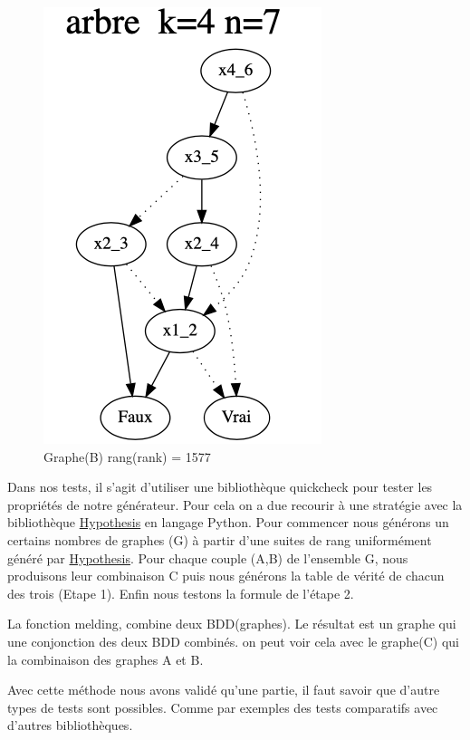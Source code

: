 \documentclass[french]{article}
\begin{document}
\begin{figure}[h!]
    \centering
    \includegraphics[scale=0.4]{arb_1577.png}
    \caption{Graphe(B) rang(rank) = 1577}
    \label{fig:graphe_B}
\end{figure}

Dans nos tests, il s'agit d'utiliser une bibliothèque quickcheck pour tester les propriétés de notre générateur.
Pour cela on a due recourir à une stratégie avec la bibliothèque \href{https://hypothesis.works}{Hypothesis} en langage Python.  Pour commencer nous générons un certains nombres de graphes (G) à partir d'une suites de rang uniformément généré par \href{https://hypothesis.works}{Hypothesis}. Pour chaque couple (A,B) de l'ensemble G, nous produisons leur combinaison C puis nous générons la table de vérité de chacun des trois (Etape 1). Enfin nous testons la formule de l'étape 2.\medskip

La fonction melding, combine deux BDD(graphes). Le résultat est un graphe qui une conjonction des deux BDD combinés. on peut voir cela avec le graphe(C) qui la combinaison des graphes A et B.

Avec cette méthode nous avons validé qu'une partie, il faut savoir que d'autre types de tests sont possibles. Comme par exemples des tests comparatifs avec d'autres bibliothèques.
\end{document}
